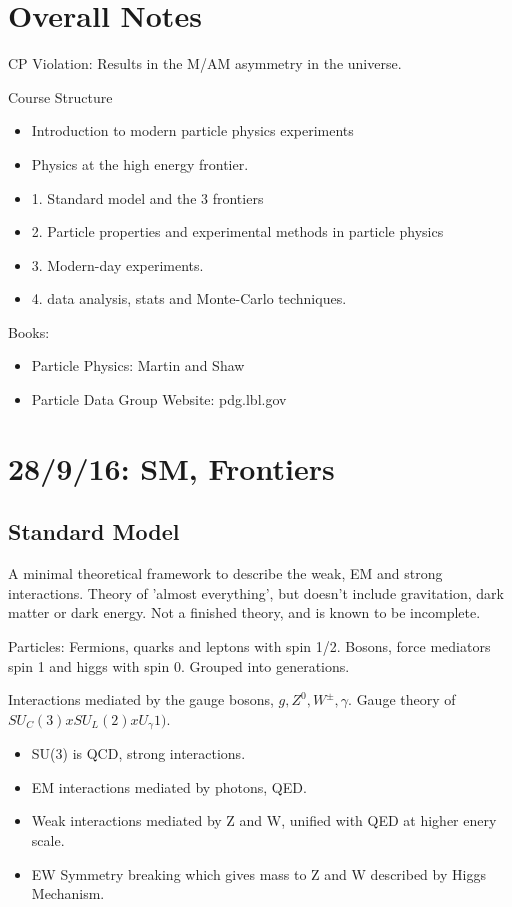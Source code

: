 \documentclass[]{article}
\begin{document}
\large

\section*{Overall Notes}

CP Violation: Results in the M/AM asymmetry in the universe.

Course Structure
\begin{itemize}
	\item Introduction to modern particle physics experiments
	\item Physics at the high energy frontier.
	\item 1. Standard model and the 3 frontiers
	\item 2. Particle properties and experimental methods in particle physics
	\item 3. Modern-day experiments.
	\item 4. data analysis, stats and Monte-Carlo techniques.
\end{itemize}

Books:
\begin{itemize}
	\item Particle Physics: Martin and Shaw
	\item Particle Data Group Website: pdg.lbl.gov
\end{itemize}

\section{28/9/16: SM, Frontiers}

\subsection{Standard Model}

A minimal theoretical framework to describe the weak, EM and strong interactions. Theory of 'almost everything', but doesn't include gravitation, dark matter or dark energy. Not a finished theory, and is known to be incomplete.

Particles:
Fermions, quarks and leptons with spin 1/2.
Bosons, force mediators spin 1 and higgs with spin 0.
Grouped into generations.

Interactions mediated by the gauge bosons, $g, Z^0, W^\pm, \gamma$. Gauge theory of $SU_C(3) x SU_L(2) x U_\gamma1)$.

\begin{itemize}
	\item SU(3) is QCD, strong interactions.
	\item EM interactions mediated by photons, QED.
	\item Weak interactions mediated by Z and W, unified with QED at higher enery scale.
	\item EW Symmetry breaking which gives mass to Z and W described by Higgs Mechanism.
\end{itemize}
\end{document}
